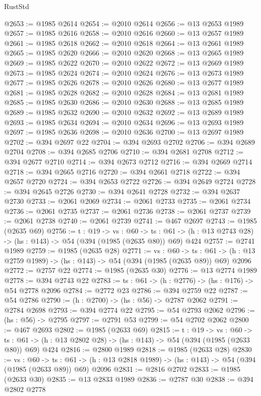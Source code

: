\begin{lexlean}{RustStd}
\begin{coremodule}
{\begin{coremodule}
{{{{{{{{@2653 := @1985 @2614
@2654 := @2010 @2614
@2656 := @13 @2653 @1989
@2657 := @1985 @2616
@2658 := @2010 @2616
@2660 := @13 @2657 @1989
@2661 := @1985 @2618
@2662 := @2010 @2618
@2664 := @13 @2661 @1989
@2665 := @1985 @2620
@2666 := @2010 @2620
@2668 := @13 @2665 @1989
@2669 := @1985 @2622
@2670 := @2010 @2622
@2672 := @13 @2669 @1989
@2673 := @1985 @2624
@2674 := @2010 @2624
@2676 := @13 @2673 @1989
@2677 := @1985 @2626
@2678 := @2010 @2626
@2680 := @13 @2677 @1989
@2681 := @1985 @2628
@2682 := @2010 @2628
@2684 := @13 @2681 @1989
@2685 := @1985 @2630
@2686 := @2010 @2630
@2688 := @13 @2685 @1989
@2689 := @1985 @2632
@2690 := @2010 @2632
@2692 := @13 @2689 @1989
@2693 := @1985 @2634
@2694 := @2010 @2634
@2696 := @13 @2693 @1989
@2697 := @1985 @2636
@2698 := @2010 @2636
@2700 := @13 @2697 @1989
@2702 := @394 @2697 @22
@2704 := @394 @2693 @2702
@2706 := @394 @2689 @2704
@2708 := @394 @2685 @2706
@2710 := @394 @2681 @2708
@2712 := @394 @2677 @2710
@2714 := @394 @2673 @2712
@2716 := @394 @2669 @2714
@2718 := @394 @2665 @2716
@2720 := @394 @2661 @2718
@2722 := @394 @2657 @2720
@2724 := @394 @2653 @2722
@2726 := @394 @2649 @2724
@2728 := @394 @2645 @2726
@2730 := @394 @2641 @2728
@2732 := @394 @2637 @2730
@2733 := @2061 @2069
@2734 := @2061 @2733
@2735 := @2061 @2734
@2736 := @2061 @2735
@2737 := @2061 @2736
@2738 := @2061 @2737
@2739 := @2061 @2738
@2740 := @2061 @2739
@2741 := @467 @2697
@2743 := @1985 (@2635 @69)
@2756 := {t : @19} ->
  {vs : @60} ->
  {ts : @61} -> (h : @13 @2743 @28) -> (hs : @143) -> @54 (@394 (@1985 (@2635 @80)) @69) @424
@2757 := @2741 @1989
@2759 := @1985 (@2635 @28)
@2771 := {vs : @60} ->
  {ts : @61} -> (h : @13 @2759 @1989) -> (hs : @143) -> @54 (@394 (@1985 (@2635 @89)) @69) @2096
@2772 := @2757 @22
@2774 := @1985 (@2635 @30)
@2776 := @13 @2774 @1989
@2778 := @394 @2743 @22
@2783 := {ts : @61} -> (h : @2776) -> (hs : @176) -> @54 @2778 @2096
@2784 := @2772 @23
@2786 := @394 @2759 @22
@2787 := @54 @2786
@2790 := (h : @2700) -> (hs : @56) -> @2787 @2062
@2791 := @2784 @2698
@2793 := @394 @2774 @22
@2795 := @54 @2793 @2062
@2796 := (hs : @56) -> @2795
@2797 := @2791 @53
@2799 := @54 @2702 @2062
@2800 := @467 @2693
@2802 := @1985 (@2633 @69)
@2815 := {t : @19} ->
  {vs : @60} ->
  {ts : @61} -> (h : @13 @2802 @28) -> (hs : @143) -> @54 (@394 (@1985 (@2633 @80)) @69) @424
@2816 := @2800 @1989
@2818 := @1985 (@2633 @28)
@2830 := {vs : @60} ->
  {ts : @61} -> (h : @13 @2818 @1989) -> (hs : @143) -> @54 (@394 (@1985 (@2633 @89)) @69) @2096
@2831 := @2816 @2702
@2833 := @1985 (@2633 @30)
@2835 := @13 @2833 @1989
@2836 := @2787 @30
@2838 := @394 @2802 @2778
}}}}}}}}
\end{coremodule}}
\end{coremodule}
\end{lexlean}
